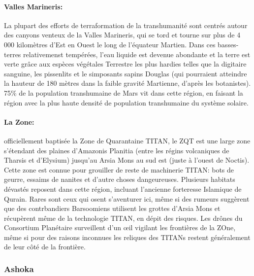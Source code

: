                                                             \paragraph{Valles Marineris:} \label{sec:valles-marineris} La plupart des efforts de terraformation de la transhumanité sont centrés autour des canyons venteux de la Valles Marineris, qui se tord et tourne sur plus de 4 000 kilomètres d'Est en Ouest le long de l'équateur Martien. Dans ces basses-terres relativemenst tempérées, l'eau liquide est devenue abondante et la terre est verte grâce aux espèces végétales Terrestre les plus hardies telles que la digitaire sanguine, les pissenlits et le simposants sapins Douglas (qui pourraient atteindre la hauteur de 180 mètres dans la faible gravité Martienne, d'après les botanistes). 75\% de la population transhumaine de Mars vit dans cette région, en faisant la région avec la plus haute densité de population transhumaine du système solaire. 

                                                            \paragraph{La Zone:} \label{sec:zone} officiellement baptisée la Zone de Quarantaine TITAN, le ZQT est une large zone s'étendant des plaines d'Amazonis Planitia (entre les régins volcaniques de Tharsis et d'Elysium) jusqu'au Arsia Mons au sud est (juste à l'ouest de Noctis). Cette zone est connue pour grouiller de reste de machinerie TITAN: bots de geurre, essaims de nanites et d'autre choses dangeureuses. Plusieurs habitats dévastés reposent dans cette région, incluant l'ancienne forteresse Islamique de Qurain. Rares sont ceux qui osent s'aventurer ici, même si des rumeurs suggèrent que des contrbandiers Barsoomiens utilisent les grottes d'Arsia Mons et récupèrent même de la technologie TITAN, en dépit des risques. Les drônes du Consortium Planétaire surveillent d'un œil vigilant les frontières de la ZOne, même si pour des raisons inconnues les reliques des TITANs restent généralement de leur côté de la frontière. 

                                                            \subsubsection{Ashoka} \label{sec:ashoka} 

